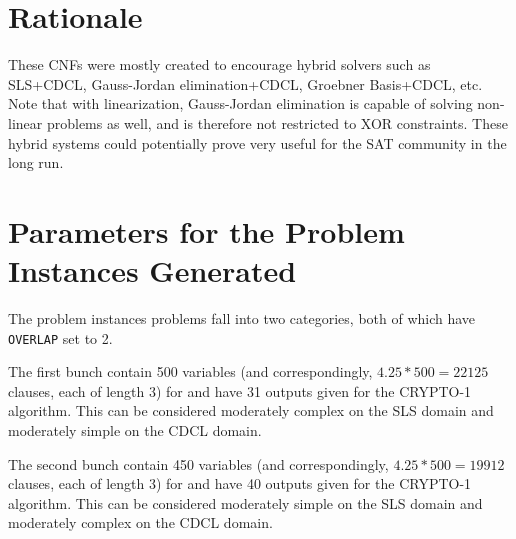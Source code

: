 \documentclass[final]{ieee}
\begin{document}
\section{Rationale}
These CNFs were mostly created to encourage hybrid solvers such as SLS+CDCL, Gauss-Jordan elimination+CDCL, Groebner Basis+CDCL, etc. Note that with linearization, Gauss-Jordan elimination is capable of solving non-linear problems as well, and is therefore not restricted to XOR constraints. These hybrid systems could potentially prove very useful for the SAT community in the long run.

\section{Parameters for the Problem Instances Generated}
The problem instances problems fall into two categories, both of which have \texttt{OVERLAP} set to 2.


The first bunch contain 500 variables (and correspondingly, $4.25*500=22125$ clauses, each of length 3) for \cite{makewff} and have 31 outputs given for the CRYPTO-1 algorithm. This can be considered moderately complex on the SLS domain and moderately simple on the CDCL domain.

The second bunch contain 450 variables (and correspondingly, $4.25*500=19912$ clauses, each of length 3) for \cite{makewff} and have 40 outputs given for the CRYPTO-1 algorithm. This can be considered moderately simple on the SLS domain and moderately complex on the CDCL domain. 

\end{document}
